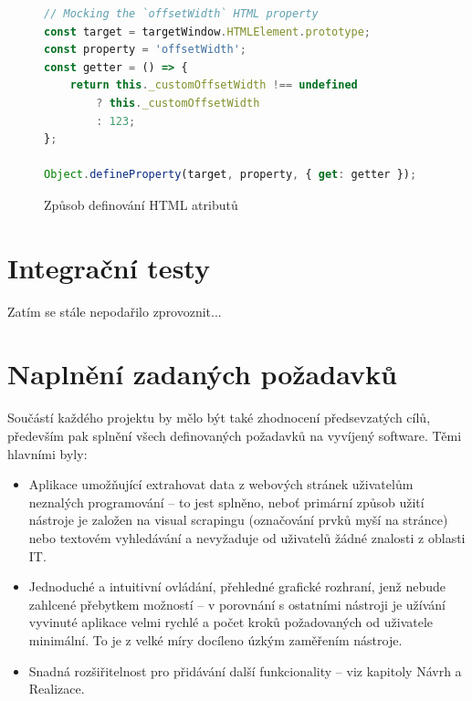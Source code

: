 \documentclass[thesis=B,czech]{FITthesis}[2012/06/26]
\begin{document}
\begin{figure}
	\begin{lstlisting}[language=JavaScript]
// Mocking the `offsetWidth` HTML property
const target = targetWindow.HTMLElement.prototype;
const property = 'offsetWidth';
const getter = () => {
	return this._customOffsetWidth !== undefined 
		? this._customOffsetWidth 
		: 123;
};

Object.defineProperty(target, property, { get: getter });
	\end{lstlisting}
	\caption{Způsob definování HTML atributů}
	\label{code:setup}
\end{figure}



\section{Integrační testy}
Zatím se stále nepodařilo zprovoznit...


\section{Naplnění zadaných požadavků}
Součástí každého projektu by mělo být také zhodnocení předsevzatých cílů, především pak splnění všech definovaných požadavků na vyvíjený software. Těmi hlavními byly:

\begin{itemize}
	\item Aplikace umožňující extrahovat data z webových stránek uživatelům neznalých programování -- to jest splněno, neboť primární způsob užití nástroje je založen na visual scrapingu (označování prvků myší na stránce) nebo textovém vyhledávání a nevyžaduje od uživatelů žádné znalosti z oblasti IT.
	\item Jednoduché a intuitivní ovládání, přehledné grafické rozhraní, jenž nebude zahlcené přebytkem možností -- v porovnání s ostatními nástroji je užívání vyvinuté aplikace velmi rychlé a počet kroků požadovaných od uživatele minimální. To je z velké míry docíleno úzkým zaměřením nástroje. 
	\item Snadná rozšiřitelnost pro přidávání další funkcionality -- viz kapitoly Návrh a Realizace.
\end{itemize}
\end{document}
